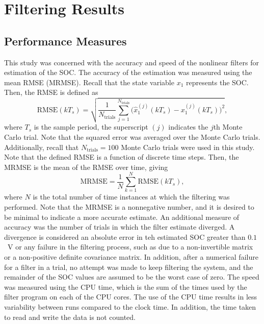 \documentclass[../zhang_thesis.tex]{subfiles}
\begin{document}
\chapter{Filtering Results}


\section{Performance Measures}

This study was concerned with the accuracy and speed of the nonlinear filters for estimation of the SOC. The accuracy of the estimation was measured using the mean RMSE (MRMSE). Recall that the state variable $x_1$ represents the SOC. Then, the RMSE is defined as
\begin{equation}
    \mathrm{RMSE}(kT_s) = \sqrt{ \frac{1}{N_\text{trials}} \sum_{j=1}^{N_\text{trials}} \Big( \hat{x}_1^{(j)}(kT_s) - x_1^{(j)}(kT_s) \Big)^2 },
\end{equation}
where $T_s$ is the sample period, the superscript $(j)$ indicates the $j$th Monte Carlo trial. Note that the squared error was averaged over the Monte Carlo trials. Additionally, recall that $N_\text{trials}=100$ Monte Carlo trials were used in this study. Note that the defined RMSE is a function of discrete time steps. Then, the MRMSE is the mean of the RMSE over time, giving
\begin{equation}
    \mathrm{MRMSE} = \frac{1}{N} \sum_{k=1}^N \mathrm{RMSE}(kT_s),
\end{equation}
where $N$ is the total number of time instances at which the filtering was performed. Note that the MRMSE is a nonnegative number, and it is desired to be minimal to indicate a more accurate estimate. An additional measure of accuracy was the number of trials in which the filter estimate diverged. A divergence is considered an absolute error in teh estimated SOC greater than $0.1$~V or any failure in the filtering process, such as due to a non-invertible matrix or a non-positive definite covariance matrix. In addition,
after a numerical failure for a filter in a trial, no attempt was made to keep filtering the system, and the remainder of the SOC values are assumed to be the worst case of zero. The speed was measured using the CPU time, which is the sum of the times used by the filter program on each of the CPU cores. The use of the CPU time results in less variability between runs compared to the clock time. In addition, the time taken to read and write the data is not counted.
\end{document}
